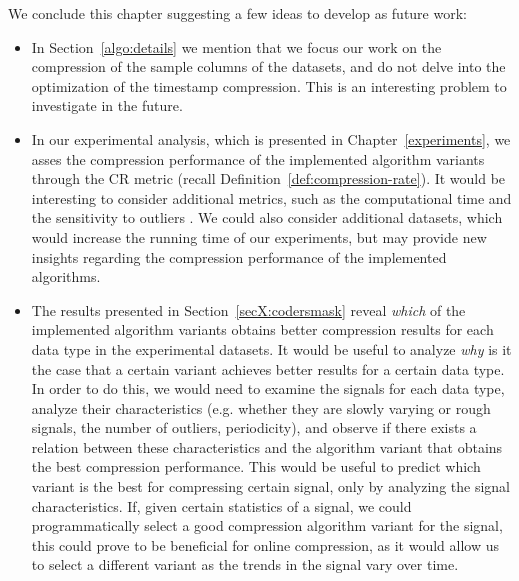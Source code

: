 \clearpage


We conclude this chapter suggesting a few ideas to develop as future work:

\vspace{-5pt}

\begin{itemize}

\item In Section~\ref{algo:details} we mention that we focus our work on the compression of the sample columns of the datasets, and do not delve into the optimization of the timestamp compression. This is an interesting problem to investigate in the future.

\item In our experimental analysis, which is presented in Chapter~\ref{experiments}, we asses the compression performance of the implemented algorithm variants through the CR metric (recall Definition~\ref{def:compression-rate}). It would be interesting to consider additional metrics, such as the computational time and the sensitivity to outliers \cite{AnEva2013}. We could also consider additional datasets, which would increase the running time of our experiments, but may provide new insights regarding the compression performance of the implemented algorithms.

\item The results presented in Section~\ref{secX:codersmask} reveal \textit{which} of the implemented algorithm variants obtains better compression results for each data type in the experimental datasets. It would be useful to analyze \textit{why} is it the case that a certain variant achieves better results for a certain data type. In order to do this, we would need to examine the signals for each data type, analyze their characteristics (e.g. whether they are slowly varying or rough signals, the number of outliers, periodicity), and observe if there exists a relation between these characteristics and the algorithm variant that obtains the best compression performance. This would be useful to predict which variant is the best for compressing certain signal, only by analyzing the signal characteristics. If, given certain statistics of a signal, we could programmatically select a good compression algorithm variant for the signal, this could prove to be beneficial for online compression, as it would allow us to select a different variant as the trends in the signal vary over time.

\end{itemize}

